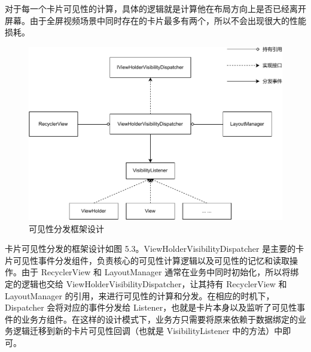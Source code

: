 对于每一个卡片可见性的计算，具体的逻辑就是计算他在布局方向上是否已经离开屏幕。由于全屏视频场景中同时存在的卡片最多有两个，所以不会出现很大的性能损耗。



\begin{figure}
    \centering
    \begin{adjustbox}{max width=\textwidth}
        \includegraphics{assets/visibility-dispatch-framework.pdf}
    \end{adjustbox}
    \caption{可见性分发框架设计}
\end{figure}


卡片可见性分发的框架设计如图 5.3。ViewHolderVisibilityDispatcher 是主要的卡片可见性事件分发组件，负责核心的可见性计算逻辑以及可见性的记忆和读取操作。由于 RecyclerView 和 LayoutManager 通常在业务中同时初始化，所以将绑定的逻辑也交给 ViewHolderVisibilityDispatcher，让其持有 RecyclerView 和 LayoutManager 的引用，来进行可见性的计算和分发。在相应的时机下，Dispatcher 会将对应的事件分发给 Listener，也就是卡片本身以及监听了可见性事件的业务方组件。在这样的设计模式下，业务方只需要将原来依赖于数据绑定的业务逻辑迁移到新的卡片可见性回调（也就是 VisibilityListener 中的方法）中即可。